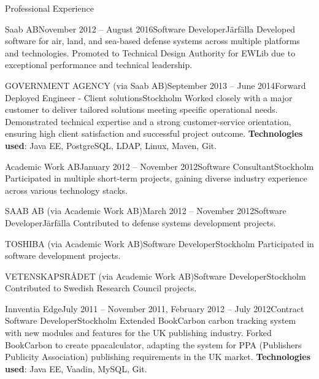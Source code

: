 \documentclass{resume}
\begin{document}
\begin{rSection}{Professional Experience}
\begin{rSubsection}{Saab AB}{November 2012 -- August 2016}{Software Developer}{Järfälla}
\bItem Developed software for air, land, and sea-based defense systems across multiple platforms and technologies.
\bItem Promoted to Technical Design Authority for EWLib due to exceptional performance and technical leadership.
\end{rSubsection}

\begin{rClientSubsection}{GOVERNMENT AGENCY (via Saab AB)}{September 2013 -- June 2014}{Forward Deployed Engineer - Client solutions}{Stockholm} %
\bItem Worked closely with a major customer to deliver tailored solutions meeting specific operational needs.
\bItem Demonstrated technical expertise and a strong customer-service orientation, ensuring high client satisfaction and successful project outcome.
\bItem \textbf{Technologies used}: Java EE, PostgreSQL, LDAP, Linux, Maven, Git.
\end{rClientSubsection}

\begin{rSubsection}{Academic Work AB}{January 2012 -- November 2012}{Software Consultant}{Stockholm}
\bItem Participated in multiple short-term projects, gaining diverse industry experience across various technology stacks.
\end{rSubsection}

\begin{rClientSubsection}{SAAB AB (via Academic Work AB)}{March 2012 -- November 2012}{Software Developer}{Järfälla}
\bItem Contributed to defense systems development projects.
\end{rClientSubsection}

\begin{rClientSubsection}{TOSHIBA (via Academic Work AB)}{}{Software Developer}{Stockholm}
\bItem Participated in software development projects.
\end{rClientSubsection}

\begin{rClientSubsection}{VETENSKAPSRÅDET (via Academic Work AB)}{}{Software Developer}{Stockholm}
\bItem Contributed to Swedish Research Council projects.
\end{rClientSubsection}

\begin{rSubsection}{Innventia Edge}{July 2011 -- November 2011, February 2012 -- July 2012}{Contract Software Developer}{Stockholm}
\bItem Extended BookCarbon carbon tracking system with new modules and features for the UK publishing industry.
\bItem Forked BookCarbon to create ppacalculator, adapting the system for PPA (Publishers Publicity Association) publishing requirements in the UK market.
\bItem \textbf{Technologies used}: Java EE, Vaadin, MySQL, Git.
\end{rSubsection}
\end{rSection}
\end{document}
